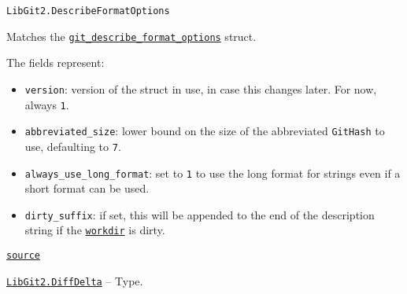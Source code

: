 \begin{adjustwidth}{2em}{0pt}


\begin{verbatim}
LibGit2.DescribeFormatOptions
\end{verbatim}

Matches the \href{https://libgit2.org/libgit2/\#HEAD/type/git\_describe\_format\_options}{\texttt{git\_describe\_format\_options}} struct.

The fields represent:

\begin{itemize}
\item \texttt{version}: version of the struct in use, in case this changes later. For now, always \texttt{1}.


\item \texttt{abbreviated\_size}: lower bound on the size of the abbreviated \texttt{GitHash} to use, defaulting to \texttt{7}.


\item \texttt{always\_use\_long\_format}: set to \texttt{1} to use the long format for strings even if a short format can be used.


\item \texttt{dirty\_suffix}: if set, this will be appended to the end of the description string if the \hyperlink{6689577338311178757}{\texttt{workdir}} is dirty.

\end{itemize}


\href{https://github.com/JuliaLang/julia/blob/44fa15b1502a45eac76c9017af94332d4557b251/base/#L0-L10}{\texttt{source}}


\end{adjustwidth}
\hypertarget{9789233943804285928}{} 
\hyperlink{9789233943804285928}{\texttt{LibGit2.DiffDelta}}  -- {Type.}

